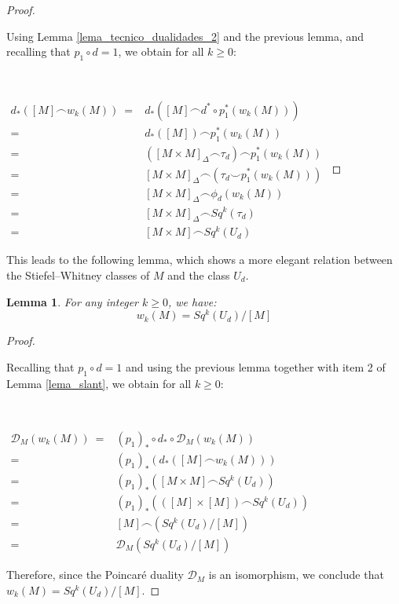\documentclass[12pt,oneside]{book}
\newtheorem{lem}    {Lemma}[chapter]
\newcommand{\ccup}{\smile}
\newcommand{\ccap}{\frown}
\begin{document}
    \begin{proof}

        \

        Using Lemma \ref{lema_tecnico_dualidades_2} and the previous lemma, and recalling that $p_{1} \circ d = 1$, we obtain for all 
        $k \geq 0$:

        \

        $\begin{array}{rl}
        	d_{*}([M] \ccap w_{k}(M)) \ = & d_{*}([M] \ccap d^{*} \circ p_{1}^{*}(w_{k}(M))) \\
        	= & d_{*}([M]) \ccap p_{1}^{*}(w_{k}(M)) \\
        	= & \left( [M \times M]_{\Delta} \ccap \tau_{d} \right) \ccap p_{1}^{*}(w_{k}(M)) \\
        	= & [M \times M]_{\Delta} \ccap \left( \tau_{d} \ccup p_{1}^{*}(w_{k}(M)) \right) \\
        	= & [M \times M]_{\Delta} \ccap \phi_{d}(w_{k}(M)) \\
        	= & [M \times M]_{\Delta} \ccap Sq^{k}(\tau_{d}) \\
        	= & [M \times M] \ccap Sq^{k}(U_{d})
        \end{array}$

    \end{proof}

    This leads to the following lemma, which shows a more elegant relation between the Stiefel–Whitney classes 
    of $M$ and the class $U_{d}$.

    \begin{lem}
    	For any integer $k \geq 0$, we have:
    	$$ w_{k}(M) = Sq^{k}(U_{d})/[M] $$
    \end{lem}

    \begin{proof}

        \

        Recalling that $p_{1} \circ d = 1$ and using the previous lemma together with item 2 of Lemma \ref{lema_slant}, we obtain for all 
        $k \geq 0$:

        \

        $\begin{array}{rl}
        	\mathcal{D}_{M}(w_{k}(M)) \ = & (p_{1})_{*} \circ d_{*} \circ \mathcal{D}_{M}(w_{k}(M)) \\
        	= & (p_{1})_{*} \left( d_{*} \left( [M] \ccap w_{k}(M) \right) \right) \\
        	= & (p_{1})_{*} \left( [M \times M] \ccap Sq^{k}(U_{d}) \right) \\
        	= & (p_{1})_{*} \left( \left( [M] \times [M] \right) \ccap Sq^{k}(U_{d}) \right) \\
        	= & [M] \ccap \left( Sq^{k}(U_{d})/[M] \right) \\
        	= & \mathcal{D}_{M}(Sq^{k}(U_{d})/[M])
        \end{array}$

        Therefore, since the Poincaré duality $\mathcal{D}_{M}$ is an isomorphism, we conclude that 
        $w_{k}(M) = Sq^{k}(U_{d})/[M]$.

    \end{proof}
\end{document}
